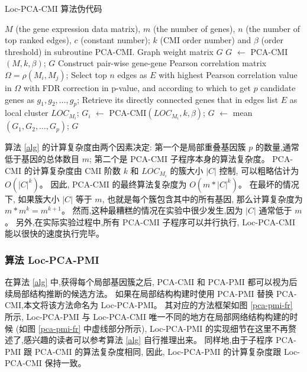 \begin{algorithm}[!htbp]
    \caption{Loc-PCA-CMI 算法伪代码}
    \label{alg}
    \begin{algorithmic}[1]
    \Require $M$ (the gene expression data matrix), $m$ (the number of genes), $n$ (the number of top ranked edges), $c$ (constant number); $k$ (CMI order number) and $\beta$ (order threshold) in subroutine PCA-CMI.
    \Ensure Graph weight matrix $G$ 
    \State $G$ $\leftarrow$ PCA-CMI$(M, k, \beta)$;
    \State \Return $G$
    \Else
    \State Construct pair-wise gene-gene Pearson correlation matrix $\Omega = \rho(M_i, M_j)$;
    \State Select top $n$ edges as $E$ with highest Pearson correlation value in $\Omega$ with FDR correction in p-value, and according to which to get 
    $p$ candidate genes as $g_1,g_2,\ldots,g_{p}$;
      \State Retrieve its directly connected genes that in edges list $E$ as local cluster $LOC_{M_i}$;
    \EndFor
      \State $G_{i}$ $\leftarrow$ PCA-CMI$(LOC_{M_i}, k, \beta)$;
    \EndFor
    \State $G$ $\leftarrow$ mean$(G_{1},G_{2},\ldots,G_{p})$;
    \State \Return $G$ 
    \EndIf
    \end{algorithmic}
\end{algorithm}

算法 \ref{alg} 的计算复杂度由两个因素决定:
 第一个是局部重叠基因簇 $p$ 的数量,通常低于基因的总体数目 $m$; 
第二个是 PCA-CMI 子程序本身的算法复杂度。
 PCA-CMI 的计算复杂度由 CMI 阶数 $k$ 和 $LOC_{M_i}$ 的簇大小 $|C|$ 控制,
可以粗略估计为 $O(|C|^k)$。
因此, PCA-CMI 的最终算法复杂度为 $O(m *|C|^k)$。
在最坏的情况下, 如果簇大小 $|C|$ 等于 $m$, 也就是每个簇包含其中的所有基因, 
那么计算复杂度为 $m*m^k = m^{k+1}$。 
然而,这种最糟糕的情况在实验中很少发生,因为 $|C|$ 通常低于 $m$。
另外,在实际实验过程中,所有 PCA-CMI 子程序可以并行执行, Loc-PCA-CMI 能以很快的速度执行完毕。

\subsubsection{算法 Loc-PCA-PMI }

在算法 \ref{alg} 中,获得每个局部基因簇之后,
 PCA-CMI 和 PCA-PMI 都可以视为后续局部结构推断的候选方法。
如果在局部结构构建时使用 PCA-PMI 替换 PCA-CMI,本文将该方法命名为 Loc-PCA-PMI。
其对应的方法框架如图 \ref{pca-pmi-fr} 所示, 
 Loc-PCA-PMI 与 Loc-PCA-CMI 唯一不同的地方在局部网络结构构建的时候 (如图 \ref{pca-pmi-fr} 中虚线部分所示),
 Loc-PCA-PMI 的实现细节在这里不再赘述了,感兴趣的读者可以参考算法 \ref{alg} 自行推理出来。
同样地,由于子程序 PCA-PMI 跟 PCA-CMI 的算法复杂度相同,
因此, Loc-PCA-PMI 的计算复杂度跟 Loc-PCA-CMI 保持一致。

